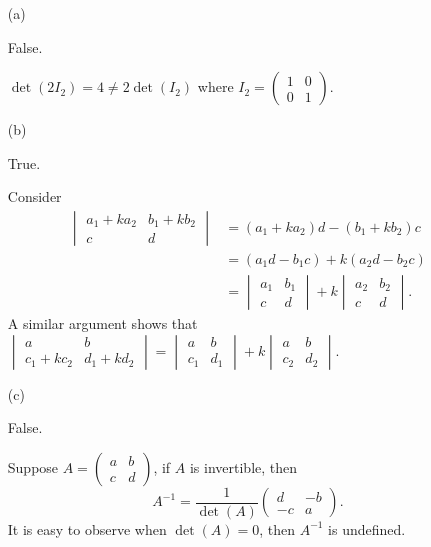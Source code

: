 \begin{Exercise}
	\begin{enumerate}[(a)]
		\item[(a)]
		\begin{answer}
			False.
		\end{answer}
		\begin{solution}
			$\det(2I_2) = 4 \neq 2\det(I_2)$ where $I_2 = \begin{pmatrix}
			1 & 0 \\
			0 & 1
			\end{pmatrix}$.
		\end{solution}
		
		\item[(b)]
		\begin{answer}
			True.
		\end{answer}
		\begin{solution}
			Consider
			\begin{align*}
			\begin{vmatrix}
			a_1 + k a_2 & b_1 + k b_2 \\
			c & d
			\end{vmatrix} 
			&= (a_1 + k a_2) d - (b_1 + k b_2) c \\
			&= (a_1 d - b_1 c) + k (a_2 d - b_2 c) \\
			&= \begin{vmatrix}
			a_1 & b_1 \\
			c & d
			\end{vmatrix} + k\begin{vmatrix}
			a_2 & b_2 \\
			c & d
			\end{vmatrix}.
			\end{align*}
			A similar argument shows that $\begin{vmatrix}
			a & b \\
			c_1 + k c_2 & d_1 + k d_2
			\end{vmatrix} = \begin{vmatrix}
			a & b \\
			c_1 & d_1
			\end{vmatrix} + k\begin{vmatrix}
			a & b \\
			c_2 & d_2
			\end{vmatrix}$.
		\end{solution}
		
		\item[(c)]
		\begin{answer}
			False.
		\end{answer}
		\begin{solution}
			Suppose $A = \begin{pmatrix}
			a & b \\
			c & d
			\end{pmatrix}$, if $A$ is invertible, then 
			$$
			A^{-1} = \frac{1}{\det(A)}\begin{pmatrix}
			d & -b \\
			-c & a
			\end{pmatrix}.
			$$
			It is easy to observe when $\det(A) = 0$, then $A^{-1}$ is undefined.
		\end{solution}
		

\end{enumerate}
\end{Exercise}
